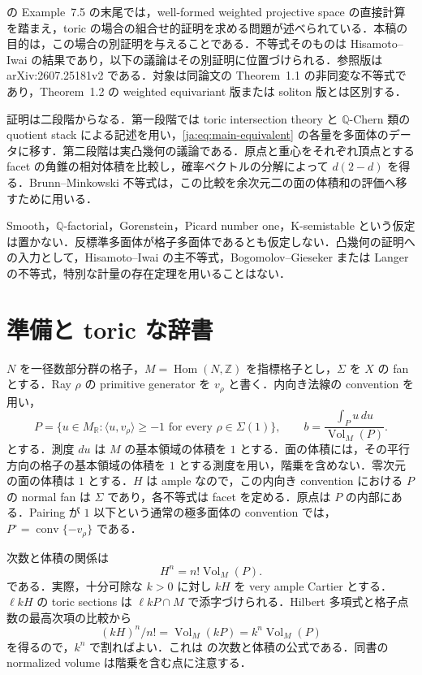 \documentclass[12pt]{amsart}
\theoremstyle{definition}
\theoremstyle{remark}
\numberwithin{equation}{section}
\theoremstyle{plain}
\theoremstyle{definition}
\theoremstyle{remark}
\begin{document}
\cite[\S7.2]{ja:HI} の Example~7.5 の末尾では，well-formed weighted projective space の直接計算を踏まえ，toric の場合の組合せ的証明を求める問題が述べられている．本稿の目的は，この場合の別証明を与えることである．不等式そのものは Hisamoto--Iwai の結果であり，以下の議論はその別証明に位置づけられる．参照版は arXiv:2607.25181v2 である．対象は同論文の Theorem~1.1 の非同変な不等式であり，Theorem~1.2 の weighted equivariant 版または soliton 版とは区別する．

証明は二段階からなる．第一段階では toric intersection theory と $\mathbb Q$-Chern 類の quotient stack による記述を用い，\eqref{ja:eq:main-equivalent} の各量を多面体のデータに移す．第二段階は実凸幾何の議論である．原点と重心をそれぞれ頂点とする facet の角錐の相対体積を比較し，確率ベクトルの分解によって $d(2-d)$ を得る．Brunn--Minkowski 不等式は，この比較を余次元二の面の体積和の評価へ移すために用いる．

Smooth，$\mathbb Q$-factorial，Gorenstein，Picard number one，K-semistable という仮定は置かない．反標準多面体が格子多面体であるとも仮定しない．凸幾何の証明への入力として，Hisamoto--Iwai の主不等式，Bogomolov--Gieseker または Langer の不等式，特別な計量の存在定理を用いることはない．

\section{準備と toric な辞書}\label{ja:sec:dictionary}
$N$ を一径数部分群の格子，$M=\operatorname{Hom}(N,\mathbb Z)$ を指標格子とし，$\Sigma$ を $X$ の fan とする．Ray $\rho$ の primitive generator を $v_\rho$ と書く．内向き法線の convention を用い，
\begin{equation}\label{ja:eq:polytope}
 P=\{u\in M_{\mathbb R}:\langle u,v_\rho\rangle\ge-1
       \text{ for every }\rho\in\Sigma(1)\},\qquad
 b=\frac{\int_Pu\,du}{\operatorname{Vol}_M(P)}.
\end{equation}
とする．測度 $du$ は $M$ の基本領域の体積を $1$ とする．面の体積には，その平行方向の格子の基本領域の体積を $1$ とする測度を用い，階乗を含めない．零次元の面の体積は $1$ とする．$H$ は ample なので，この内向き convention における $P$ の normal fan は $\Sigma$ であり，各不等式は facet を定める．原点は $P$ の内部にある．Pairing が $1$ 以下という通常の極多面体の convention では，$P^\circ=\operatorname{conv}\{-v_\rho\}$ である．

次数と体積の関係は
\begin{equation}\label{ja:eq:degree}
 H^n=n!\operatorname{Vol}_M(P).
\end{equation}
である．実際，十分可除な $k>0$ に対し $kH$ を very ample Cartier とする．$\ell kH$ の toric sections は $\ell kP\cap M$ で添字づけられる．Hilbert 多項式と格子点数の最高次項の比較から
\[
(kH)^n/n!=\operatorname{Vol}_M(kP)=k^n\operatorname{Vol}_M(P)
\]
を得るので，$k^n$ で割ればよい．これは \cite[Theorem~13.4.3]{ja:CLS} の次数と体積の公式である．同書の normalized volume は階乗を含む点に注意する．
\end{document}
